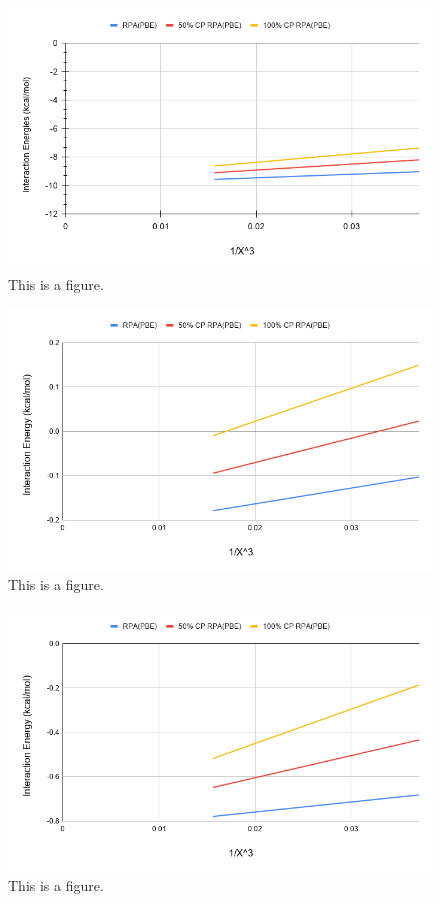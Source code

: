 \documentclass[11pt]{article}
\begin{document}
\begin{figure}
  \includegraphics[scale=0.5]{tpss_38.png}
  \caption{This is a figure.}
  \label{fig:<name>}
\end{figure}

\begin{figure}
  \includegraphics[scale=0.5]{tpssh_1.png}
  \caption{This is a figure.}
  \label{fig:<name>}
\end{figure}

\begin{figure}
  \includegraphics[scale=0.5]{tpssh_8.png}
  \caption{This is a figure.}
  \label{fig:<name>}
\end{figure}
\end{document}
